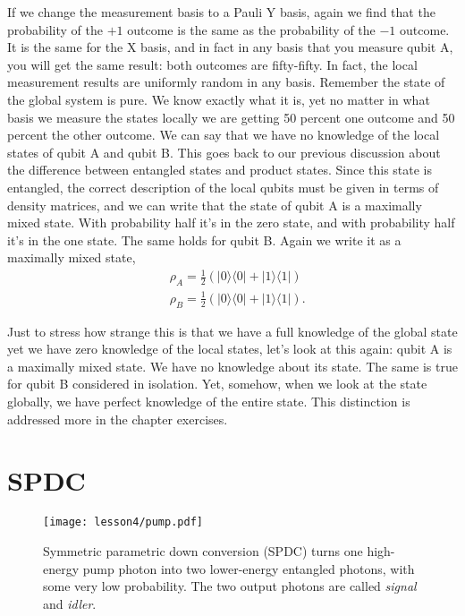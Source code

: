 If we change the measurement basis to a Pauli Y basis, again we find that the probability of the $+1$ outcome is the same as the probability of the $-1$ outcome. It is the same for the X basis, and in fact in any basis that you measure qubit A, you will get the same result: both outcomes are fifty-fifty. In fact, the local measurement results are uniformly random in any basis. Remember the state of the global system is pure. We know exactly what it is, yet no matter in what basis we measure the states locally we are getting 50 percent one outcome and 50 percent the other outcome. We can say that we have no knowledge of the local states of qubit A and qubit B. This goes back to our previous discussion about the difference between entangled states and product states.  Since this state is entangled, the correct description of the local qubits must be given in terms of density matrices, and we can write that the state of qubit A is a maximally mixed state. With probability half it's in the zero state, and with probability half it's in the one state. The same holds for qubit B. Again we write it as a maximally mixed state,
\begin{equation}
\begin{aligned}
&\rho_A=\frac{1}{2}(|0\rangle\langle 0|+| 1\rangle\langle 1|) \\
&\rho_B=\frac{1}{2}(|0\rangle\langle 0|+| 1\rangle\langle 1|).
\end{aligned}
\end{equation}

Just to stress how strange this is that we have a full knowledge of the global state yet we have zero knowledge of the local states, let's look at this again: qubit A is a maximally mixed state. We have no knowledge about its state. The same is true for qubit B considered in isolation. Yet, somehow, when we look at the state globally, we have perfect knowledge of the entire state. This distinction is addressed more in the chapter exercises.


\section{SPDC}
\label{sec:4-4_spdc}

\begin{figure}[H]
    \centering
    \texttt{[image: lesson4/pump.pdf]}
    
        \caption[Symmetric parametric down conversion (SPDC)]{Symmetric parametric down conversion (SPDC) turns one high-energy pump photon into two lower-energy entangled photons, with some very low probability. The two output photons are called \emph{signal} and \emph{idler}.}
    \label{fig:spdc}
    
\end{figure}

